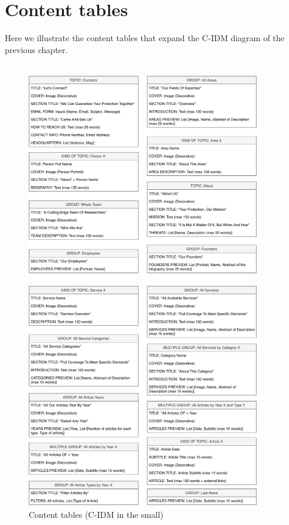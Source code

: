 \documentclass[12pt]{report}
\begin{document}
\chapter{Content tables}
Here we illustrate the content tables that expand the C-IDM diagram of the previous 
chapter.\\\\
\begin{figure}[h]
	\centering
	\includegraphics[width=0.9\textwidth]{content_tables_pt1.pdf}
\end{figure}
\begin{figure}[h]
	\centering
	\includegraphics[width=0.9\textwidth]{content_tables_pt2.pdf}
	\caption{Content tables (C-IDM in the small)}
\end{figure}
\end{document}
